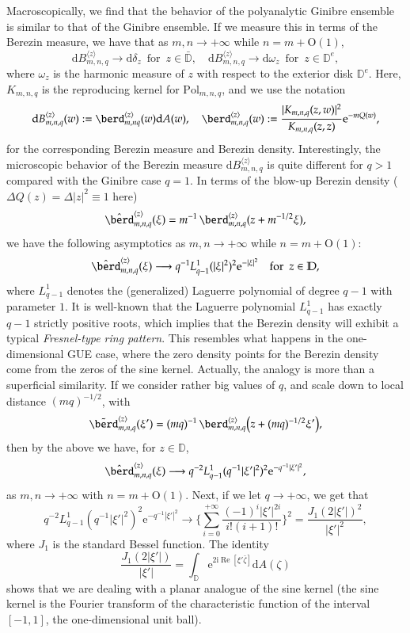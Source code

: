 \documentclass{birkart}
\theoremstyle{definition}
\theoremstyle{remark}
\numberwithin{equation}{section}
\numberwithin{figure}{section}
\newcommand{\e}{\mathrm e}
\newcommand{\1}{{\mathbf 1}}
\newcommand{\Rpar}{q}
\newcommand{\D}{{\mathbb D}}
\newcommand{\Ordo}{\mathrm{O}}
\newcommand{\re}{\operatorname{Re}}
\newcommand{\diff}{{\mathrm d}}
\newcommand{\imag}{{\mathrm i}}
\begin{document}
 Macroscopically, we find that the behavior of the 
polyanalytic Ginibre ensemble is similar to that of the Ginibre ensemble. 
If we measure this in terms of the Berezin measure, we have that as 
$m,n\to+\infty$ while $n=m+\Ordo(1)$, 
\[
\diff B_{m,n,\Rpar}^{\langle z\rangle}\to\diff\delta_z\,\,\,\text{for}\,\,\,
z\in\bar\D,\quad
\diff B_{m,n,\Rpar}^{\langle z\rangle}\to\diff\omega_z\,\,\,\text{for}\,\,\,
z\in\D^e,
\]
where $\omega_z$ is the harmonic measure of $z$ with respect to the exterior 
disk $\D^e$. Here, $K_{m,n,\Rpar}$ is the reproducing kernel for 
$\mathrm{Pol}_{m,n,\Rpar}$, and we use the notation
\[ 
\diff B_{m,n,\Rpar}^{\langle z\rangle}(w):=
\berd_{m,n\Rpar}^{\langle z\rangle}(w)\diff A(w),\quad
 \berd_{m,n,\Rpar}^{\langle z\rangle}(w):= 
\frac{|K_{m,n,\Rpar}(z,w)|^2}{K_{m,n,\Rpar}(z,z)}\e^{-mQ(w)}, 
\]
for the corresponding Berezin measure and Berezin density. Interestingly, 
the microscopic behavior of the Berezin measure 
$\diff B^{\langle z\rangle}_{m,n,\Rpar}$ is 
quite different for $\Rpar>1$ compared with the Ginibre case $\Rpar=1$. 
In terms of the blow-up Berezin density ($\Delta Q(z)=\Delta|z|^2\equiv1$ here)
\[
\hat{\berd}_{m,n,\Rpar}^{\langle z\rangle}(\xi)=m^{-1}\,
\berd^{\langle z\rangle}_{m,n,\Rpar}(z+m^{-1/2}\xi), 
\]
we have the following asymptotics as $m,n\to+\infty$ while $n=m+\Ordo(1)$:
\[
\hat{\berd}_{m,n,\Rpar}^{\langle z\rangle}(\xi)\longrightarrow\Rpar^{-1}
L^{1}_{\Rpar-1}(|\xi|^2)^2\e^{-|\xi|^2}\quad\text{for}\,\,\, z\in\D,
\]
where $L^{1}_{\Rpar-1}$ denotes the (generalized) Laguerre 
polynomial of degree $\Rpar-1$ with parameter $1$. It is well-known that 
the Laguerre polynomial $L^{1}_{\Rpar-1}$ has exactly $\Rpar-1$ strictly 
positive roots, which implies that the Berezin density will exhibit a typical 
{\em Fresnel-type ring pattern}. This resembles what happens in the 
one-dimensional GUE case, where the zero density points for the Berezin
density come from the zeros of the sine kernel. Actually, the analogy is more
than a superficial similarity. If we consider rather big values of $q$, 
and scale down to local distance $(mq)^{-1/2}$, with 
\[
\tilde{\berd}_{m,n,\Rpar}^{\langle z\rangle}(\xi')=(mq)^{-1}\,
\berd^{\langle z\rangle}_{m,n,\Rpar}\big(z+(mq)^{-1/2}\xi'\big), 
\]
then 
by the above we have, for $z\in\D$, 
\[
\hat{\berd}_{m,n,\Rpar}^{\langle z\rangle}(\xi)\longrightarrow\Rpar^{-2}
L^{1}_{\Rpar-1}(q^{-1}|\xi'|^2)^2\e^{-q^{-1}|\xi'|^2},
\]
as $m,n\to+\infty$ with $n=m+\Ordo(1)$. Next, if we let $q\to+\infty$, we
get that
\[
\Rpar^{-2}
L^{1}_{\Rpar-1}(q^{-1}|\xi'|^2)^2\e^{-q^{-1}|\xi'|^2}\longrightarrow
\bigg\{\sum_{i=0}^{+\infty}\frac{(-1)^i|\xi'|^{2i}}{i!(i+1)!}\bigg\}^2
=\frac{J_1(2|\xi'|)^2}{|\xi'|^2},
\]
where $J_1$ is the standard Bessel function. The identity
\[
\frac{J_1(2|\xi'|)}{|\xi'|}=\int_\D\e^{2\imag\re[\xi'\bar\zeta]}\diff A(\zeta)
\]
shows that we are dealing with a planar analogue of the sine kernel 
(the sine kernel is the Fourier transform of the characteristic function of
the interval $[-1,1]$, the one-dimensional unit ball).
\end{document}
